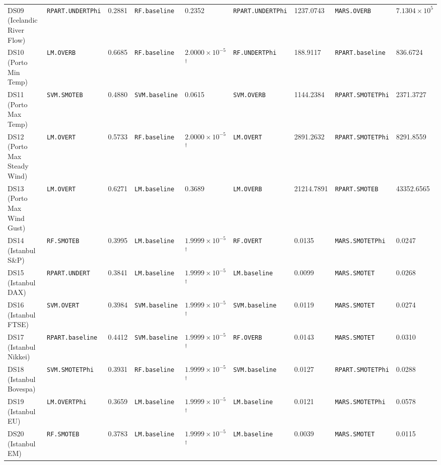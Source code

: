 \begin{table}[t]
{{\begin{tabular}{lllllllll}
DS09 (Icelandic River Flow) & \texttt{RPART.UNDERTPhi} & 0.2881 & \texttt{RF.baseline} & 0.2352 & \texttt{RPART.UNDERTPhi} & 1237.0743 & \texttt{MARS.OVERB} & $7.1304 \times 10^{5}$ \\
DS10 (Porto Min Temp) & \texttt{LM.OVERB} & 0.6685 & \texttt{RF.baseline} & $2.0000 \times 10^{-5}$$^\dagger$ & \texttt{RF.UNDERTPhi} & 188.9117 & \texttt{RPART.baseline} & 836.6724 \\
DS11 (Porto Max Temp) & \texttt{SVM.SMOTEB} & 0.4880 & \texttt{SVM.baseline} & 0.0615 & \texttt{SVM.OVERB} & 1144.2384 & \texttt{RPART.SMOTETPhi} & 2371.3727 \\
DS12 (Porto Max Steady Wind) & \texttt{LM.OVERT} & 0.5733 & \texttt{RF.baseline} & $2.0000 \times 10^{-5}$$^\dagger$ & \texttt{LM.OVERT} & 2891.2632 & \texttt{RPART.SMOTETPhi} & 8291.8559 \\
DS13 (Porto Max Wind Gust) & \texttt{LM.OVERT} & 0.6271 & \texttt{LM.baseline} & 0.3689 & \texttt{LM.OVERB} & 21214.7891 & \texttt{RPART.SMOTEB} & 43352.6565 \\
DS14 (Istanbul S\&P) & \texttt{RF.SMOTEB} & 0.3995 & \texttt{LM.baseline} & $1.9999 \times 10^{-5}$$^\dagger$ & \texttt{RF.OVERT} & 0.0135 & \texttt{MARS.SMOTETPhi} & 0.0247 \\
DS15 (Istanbul DAX) & \texttt{RPART.UNDERT} & 0.3841 & \texttt{LM.baseline} & $1.9999 \times 10^{-5}$$^\dagger$ & \texttt{LM.baseline} & 0.0099 & \texttt{MARS.SMOTET} & 0.0268 \\
DS16 (Istanbul FTSE) & \texttt{SVM.OVERT} & 0.3984 & \texttt{SVM.baseline} & $1.9999 \times 10^{-5}$$^\dagger$ & \texttt{SVM.baseline} & 0.0119 & \texttt{MARS.SMOTET} & 0.0274 \\
DS17 (Istanbul Nikkei) & \texttt{RPART.baseline} & 0.4412 & \texttt{SVM.baseline} & $1.9999 \times 10^{-5}$$^\dagger$ & \texttt{RF.OVERB} & 0.0143 & \texttt{MARS.SMOTET} & 0.0310 \\
DS18 (Istanbul Bovespa) & \texttt{SVM.SMOTETPhi} & 0.3931 & \texttt{RF.baseline} & $1.9999 \times 10^{-5}$$^\dagger$ & \texttt{SVM.baseline} & 0.0127 & \texttt{RPART.SMOTETPhi} & 0.0288 \\
DS19 (Istanbul EU) & \texttt{LM.OVERTPhi} & 0.3659 & \texttt{LM.baseline} & $1.9999 \times 10^{-5}$$^\dagger$ & \texttt{LM.baseline} & 0.0121 & \texttt{MARS.SMOTETPhi} & 0.0578 \\
DS20 (Istanbul EM) & \texttt{RF.SMOTEB} & 0.3783 & \texttt{LM.baseline} & $1.9999 \times 10^{-5}$$^\dagger$ & \texttt{LM.baseline} & 0.0039 & \texttt{MARS.SMOTET} & 0.0115 \\
\bottomrule
\end{tabular}%
}%
}
\end{table}
